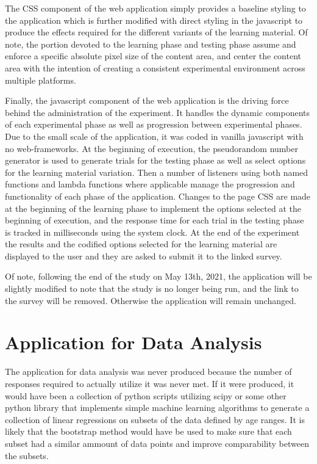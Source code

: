 \documentclass[12pt]{report}
\begin{document}
The CSS component of the web application simply provides a baseline styling to the application which is further modified with direct styling in the javascript to produce the effects required for the different variants of the learning material. Of note, the portion devoted to the learning phase and testing phase assume and enforce a specific absolute pixel size of the content area, and center the content area with the intention of creating a consistent experimental environment across multiple platforms.

Finally, the javascript component of the web application is the driving force behind the administration of the experiment. It handles the dynamic components of each experimental phase as well as progression between experimental phases. Due to the small scale of the application, it was coded in vanilla javascript with no web-frameworks. At the beginning of execution, the pseudorandom number generator is used to generate trials for the testing phase as well as select options for the learning material variation. Then a number of listeners using both named functions and lambda functions where applicable manage the progression and functionality of each phase of the application. Changes to the page CSS are made at the beginning of the learning phase to implement the options selected at the beginning of execution, and the response time for each trial in the testing phase is tracked in milliseconds using the system clock. At the end of the experiment the results and the codified options selected for the learning material are displayed to the user and they are asked to submit it to the linked survey.

Of note, following the end of the study on May 13th, 2021, the application will be slightly modified to note that the study is no longer being run, and the link to the survey will be removed. Otherwise the application will remain unchanged.

\section{Application for Data Analysis}
\label{sec:app anal}

The application for data analysis was never produced because the number of responses required to actually utilize it was never met. If it were produced, it would have been a collection of python scripts utilizing scipy or some other python library that implements simple machine learning algorithms to generate a collection of linear regressions on subsets of the data defined by age ranges. It is likely that the bootstrap method would have be used to make sure that each subset had a similar ammount of data points and improve comparability between the subsets.
\end{document}
